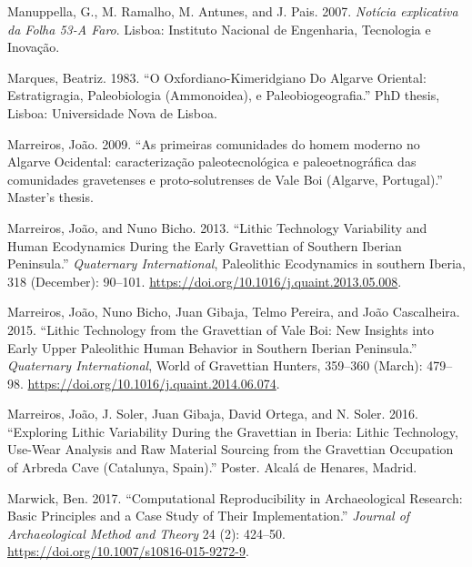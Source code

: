 \documentclass[
  a4paper,
  DIV=11,
  numbers=noendperiod]{scrreprt}
\newlength{\cslhangindent}
\newenvironment{CSLReferences}[2] %
 {\begin{list}{}{%
  \setlength{\itemindent}{0pt}
  \setlength{\leftmargin}{0pt}
  \setlength{\parsep}{0pt}
  \ifodd #1
   \setlength{\leftmargin}{\cslhangindent}
   \setlength{\itemindent}{-1\cslhangindent}
  \fi
  \setlength{\itemsep}{#2\baselineskip}}}
 {\end{list}}
\begin{document}
\begin{CSLReferences}{1}{0}
Manuppella, G., M. Ramalho, M. Antunes, and J. Pais. 2007.
\emph{{Not{í}cia explicativa da Folha 53-A Faro}}. Lisboa: Instituto
Nacional de Engenharia, Tecnologia e Inova{ç}{ã}o.

Marques, Beatriz. 1983. {``O {Oxfordiano-Kimeridgiano} Do {Algarve}
Oriental: Estratigragia, Paleobiologia ({Ammonoidea}), e
Paleobiogeografia.''} PhD thesis, Lisboa: Universidade Nova de Lisboa.

Marreiros, João. 2009. {``{As primeiras comunidades do homem moderno no
Algarve Ocidental: caracteriza{ç}{ã}o paleotecnol{ó}gica e
paleoetnogr{á}fica das comunidades gravetenses e proto-solutrenses de
Vale Boi (Algarve, Portugal)}.''} Master's thesis.

Marreiros, João, and Nuno Bicho. 2013. {``Lithic Technology Variability
and Human Ecodynamics During the {Early Gravettian} of {Southern Iberian
Peninsula}.''} \emph{Quaternary International}, Paleolithic
{Ecodynamics} in southern {Iberia}, 318 (December): 90--101.
\url{https://doi.org/10.1016/j.quaint.2013.05.008}.

Marreiros, João, Nuno Bicho, Juan Gibaja, Telmo Pereira, and João
Cascalheira. 2015. {``Lithic Technology from the {Gravettian} of {Vale
Boi}: New Insights into {Early Upper Paleolithic} Human Behavior in
{Southern Iberian Peninsula}.''} \emph{Quaternary International}, World
of {Gravettian Hunters}, 359--360 (March): 479--98.
\url{https://doi.org/10.1016/j.quaint.2014.06.074}.

Marreiros, João, J. Soler, Juan Gibaja, David Ortega, and N. Soler.
2016. {``Exploring Lithic Variability During the {Gravettian} in
{Iberia}: {Lithic} Technology, Use-Wear Analysis and Raw Material
Sourcing from the {Gravettian} Occupation of {Arbreda Cave}
({Catalunya}, {Spain}).''} Poster. Alcal{á} de Henares, Madrid.

Marwick, Ben. 2017. {``Computational {Reproducibility} in
{Archaeological Research}: {Basic Principles} and a {Case Study} of
{Their Implementation}.''} \emph{Journal of Archaeological Method and
Theory} 24 (2): 424--50.
\url{https://doi.org/10.1007/s10816-015-9272-9}.


\end{CSLReferences}
\end{document}
